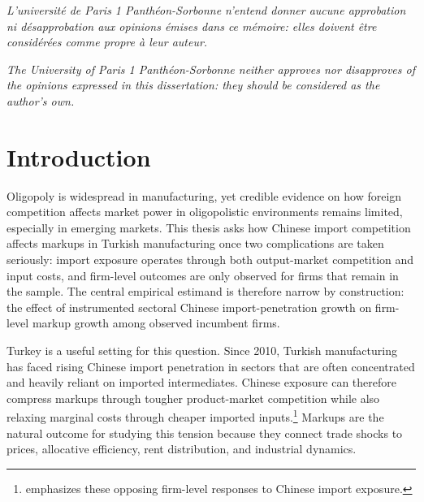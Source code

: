 \documentclass[12pt]{article}
\begin{document}
\newpage
\thispagestyle{empty}
\begin{center}
\bigskip\vspace*{6in}

\textit{L'universit\'{e} de Paris 1 Panth\'{e}on-Sorbonne n'entend donner aucune approbation
ni d\'{e}sapprobation aux opinions \'{e}mises dans ce m\'{e}moire: elles doivent \^{e}tre consid\'{e}r\'{e}es comme propre \`{a} leur auteur.}

\bigskip\vspace*{0.25in}

\textit{The University of Paris 1 Panth\'{e}on-Sorbonne neither approves nor
disapproves of the opinions expressed in this dissertation: they should be
considered as the author's own.}
\end{center}

\pagebreak%
\tableofcontents
\pagebreak%
\onehalfspacing

\section{Introduction}

Oligopoly is widespread in manufacturing, yet credible evidence on how foreign competition affects market power in oligopolistic environments remains limited, especially in emerging markets. This thesis asks how Chinese import competition affects markups in Turkish manufacturing once two complications are taken seriously: import exposure operates through both output-market competition and input costs, and firm-level outcomes are only observed for firms that remain in the sample. The central empirical estimand is therefore narrow by construction: the effect of instrumented sectoral Chinese import-penetration growth on firm-level markup growth among observed incumbent firms.

Turkey is a useful setting for this question. Since 2010, Turkish manufacturing has faced rising Chinese import penetration in sectors that are often concentrated and heavily reliant on imported intermediates. Chinese exposure can therefore compress markups through tougher product-market competition while also relaxing marginal costs through cheaper imported inputs.\footnote{\textcite{aghionOpposingFirmLevelResponses2024} emphasizes these opposing firm-level responses to Chinese import exposure.} Markups are the natural outcome for studying this tension because they connect trade shocks to prices, allocative efficiency, rent distribution, and industrial dynamics.
\end{document}
